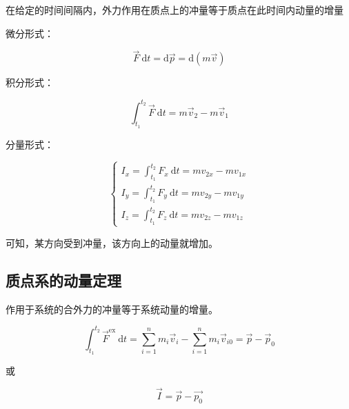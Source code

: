 \documentclass[
	12pt, %
	a4paper, %
]{myLegrandOrangeBook}
\begin{document}
    \vspace{1em}
    \begin{theorem}[动量定理]

        在给定的时间间隔内，外力作用在质点上的冲量等于质点在此时间内动量的增量

        微分形式：

        \begin{equation}
            \overrightarrow{F} \mathrm{~d} t=\mathrm{d} \overrightarrow{p}=\mathrm{d}(m \overrightarrow{v})
        \end{equation}

        积分形式：

        \begin{equation}
            \int_{t_1}^{t_2} \overrightarrow{F} \mathrm{~d} t = m \overrightarrow{v}_2-m \overrightarrow{v}_1
        \end{equation}

        分量形式：

        \begin{equation}
            \left\{\begin{array}{l}
            I_x=\int_{t_1}^{t_2} F_x \mathrm{~d} t=m v_{2 x}-m v_{1 x} \\
            I_y=\int_{t_1}^{t_2} F_y \mathrm{~d} t=m v_{2 y}-m v_{1 y} \\
            I_z=\int_{t_1}^{t_2} F_z \mathrm{~d} t=m v_{2 z}-m v_{1 z}
            \end{array}\right.
        \end{equation}

        可知，某方向受到冲量，该方向上的动量就增加。

    \end{theorem}

    \subsection{质点系的动量定理}

    \vspace{1em}
    \begin{theorem}[质点系的动量定理]

        作用于系统的合外力的冲量等于系统动量的增量。

        \begin{equation}
            \int_{t_1}^{t_2} \overrightarrow{F}^{\mathrm{ex}} \mathrm{~d} t=
            \sum_{i=1}^n m_i \overrightarrow{v}_i-\sum_{i=1}^n m_i \overrightarrow{v}_{i 0}
            =\overrightarrow{p}-\overrightarrow{p}_0
        \end{equation}

        或

        \[
            \overrightarrow{I} = \overrightarrow{p} - \overrightarrow{p_{0}}
        \]

    \end{theorem}
\end{document}
